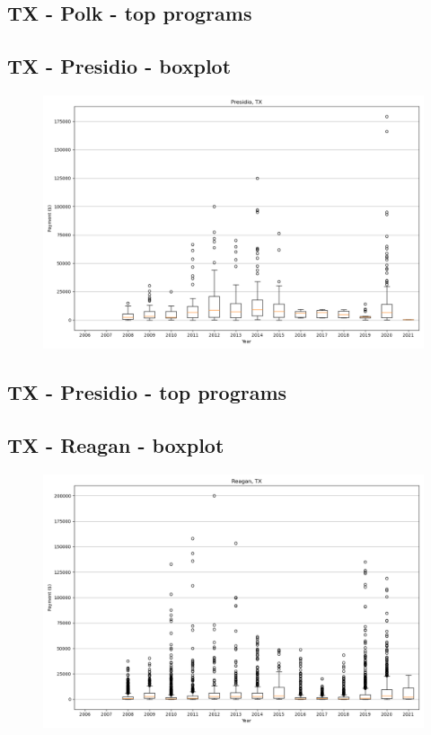 \subsection*{TX - Polk - top programs}

\newpage
\subsection*{TX - Presidio - boxplot}
\begin{figure}[h]
\centering
\includegraphics[width=7in]{../output/boxplots/counties/Presidio-TX_boxplot.png}
\end{figure}


\subsection*{TX - Presidio - top programs}

\newpage
\subsection*{TX - Reagan - boxplot}
\begin{figure}[h]
\centering
\includegraphics[width=7in]{../output/boxplots/counties/Reagan-TX_boxplot.png}
\end{figure}


